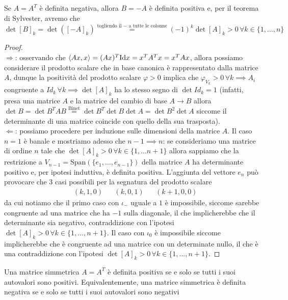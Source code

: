 \documentclass[openany, italian]{book}
\begin{document}
\begin{remark}
Se $A=A^{T}$ è definita negativa, allora $B=-A$ è definita positiva e, per il teorema di Sylvester, avremo che
$$
\det{[B]_k} = \det{([-A]_k)} \stackrel{\text{togliendo il } - \text{ a tutte le colonne}}{=} (-1)^k \det{[A]_k} > 0 \, \forall k \in \{1, \ldots, n \}
$$
\end{remark}
\begin{proof} \hspace{1cm} \\
$\boxed{\Rightarrow}$: osservando che $\langle Ax, x \rangle = (Ax)^T \text{Id} x = x^T A^T x = x^T A x$, allora possiamo considerare il prodotto scalare che in base canonica è rappresentato dalla matrice $A$, dunque la positività del prodotto scalare $\varphi > 0$ implica che $\varphi_{V_k} > 0 \, \forall k \implies A_i$ congruente a $Id_k \, \forall k \implies \det{[A]_k}$ ha lo stesso segno di $\det{Id_k} = 1$ (infatti, presa una matrice $A$ e la matrice del cambio di base $A \to B$ allora $\det{B} = \det{B^T A B} \stackrel{\text{Binet}}{=} \det{B^T}\det{B}\det{A} = \det{B}^2 \det{A}$ siccome il determinante di una matrice coincide con quello della sua trasposta). \\
$\boxed{\Leftarrow}$: possiamo procedere per induzione sulle dimensioni della matrice $A$. Il caso $n=1$ è banale e mostriamo adesso che $n-1 \implies n$: se consideriamo una matrice di ordine $n$ tale che $\det{[A]_{k}} > 0 \, \forall k \in \{1, \ldots n+1 \}$ allora sappiamo che la restrizione a $V_{n-1} = \text{Span}(\{e_1, \ldots, e_{n-1} \})$ della matrice $A$ ha determinante positivo e, per ipotesi induttiva, è definita positiva. L'aggiunta del vettore $e_n$ può provocare che $3$ casi possibili per la segnatura del prodotto scalare
\begin{align*}
&(k, 1, 0) & &(k, 0, 1) & &(k+1, 0, 0)
\end{align*}
da cui notiamo che il primo caso con $\iota_-$ uguale a $1$ è impossibile, siccome sarebbe congruente ad una matrice che ha $-1$ sulla diagonale, il che implicherebbe che il determinante sia negativo, contraddizione con l'ipotesi $\det{[A]_k} > 0 \, \forall k \in \{1, \ldots, n+1\}$. Il caso con $\iota_0$ è impossibile siccome implicherebbe che è congruente ad una matrice con un determinate nullo, il che è una contraddizione con l'ipotesi $\det{[A]_k} > 0 \, \forall k \in \{1, \ldots, n+1 \}$.
\end{proof}
\begin{cor}
Una matrice simmetrica $A=A^T$ è definita positiva se e solo se tutti i suoi autovalori sono positivi. Equivalentemente, una matrice simmetrica è definita negativa se e solo se tutti i suoi autovalori sono negativi
\end{cor}
\end{document}
